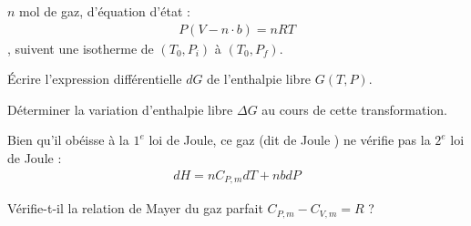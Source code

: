 \begin{exercise}

$n$ mol de gaz, d’équation d’état :
\begin{align*}
P (V-n \cdot b) = n RT
\end{align*}
, suivent une isotherme de $(T_0, P_i)$ à $(T_0, P_f)$.

\begin{questions}
\question Écrire l’expression différentielle $dG$ de l’enthalpie libre $G(T,P)$.

\question Déterminer la variation d’enthalpie libre $\Delta G$ au cours de cette transformation.

\question Bien qu’il obéisse à la $1^e$ loi de Joule, ce gaz (dit \og de Joule \fg{}) ne vérifie pas la $2^e$ loi de Joule :
\begin{align*}
dH = n C_{P,m} dT + n b dP
\end{align*}

Vérifie-t-il la relation de Mayer du gaz parfait $C_{P,m} - C_{V,m} = R$ ?
\end{questions}

\end{exercise}